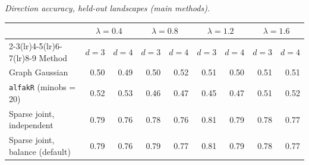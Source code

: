 \par\medskip\noindent\begin{minipage}{\linewidth}
\textit{Direction accuracy, held-out landscapes (main methods).}
\begin{center}
\footnotesize
\setlength{\tabcolsep}{3.5pt}
\begin{tabular}{l*{8}{r}}
\toprule
 & \multicolumn{2}{c}{$\lambda=0.4$} & \multicolumn{2}{c}{$\lambda=0.8$} & \multicolumn{2}{c}{$\lambda=1.2$} & \multicolumn{2}{c}{$\lambda=1.6$} \\
\cmidrule(lr){2-3}\cmidrule(lr){4-5}\cmidrule(lr){6-7}\cmidrule(lr){8-9}
Method & $d=3$ & $d=4$ & $d=3$ & $d=4$ & $d=3$ & $d=4$ & $d=3$ & $d=4$ \\
\midrule
Graph Gaussian & 0.50 & 0.49 & 0.50 & 0.52 & 0.51 & 0.50 & 0.51 & 0.51 \\
\texttt{alfakR} (minobs = 20) & 0.52 & 0.53 & 0.46 & 0.47 & 0.45 & 0.47 & 0.51 & 0.52 \\
Sparse joint, independent & 0.79 & 0.76 & 0.78 & 0.76 & 0.81 & 0.79 & 0.78 & 0.77 \\
Sparse joint, balance (default) & 0.79 & 0.76 & 0.79 & 0.77 & 0.81 & 0.79 & 0.78 & 0.77 \\
\bottomrule
\end{tabular}
\end{center}
\end{minipage}

